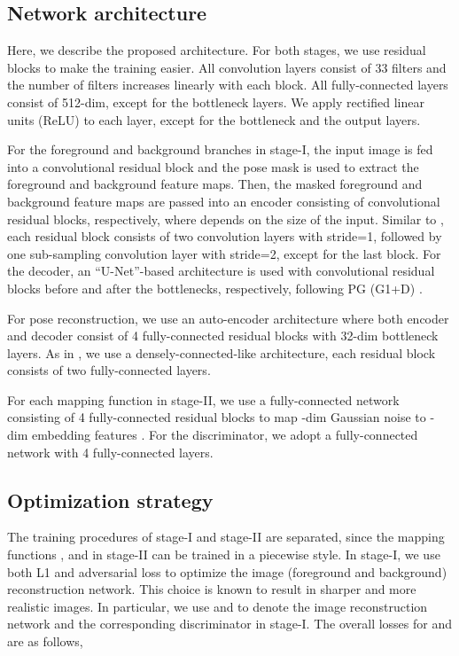 \documentclass[10pt,twocolumn,letterpaper]{article}
\begin{document}
\subsection{Network architecture}
Here, we describe the proposed architecture. 
For both stages, we use residual blocks to make the training easier. 
All convolution layers consist of 33 filters and the number of filters increases linearly with each block. 
All fully-connected layers consist of 512-dim, except for the bottleneck layers. 
We apply rectified linear units (ReLU) to each layer, except for the bottleneck and the output layers.

For the foreground and background branches in stage-\RN{1}, the input image is fed into a convolutional residual block and the pose mask is used to extract the foreground and background feature maps. 
Then, the masked foreground and background feature maps are passed into an encoder consisting of  convolutional residual blocks, respectively, where  depends on the size of the input. 
Similar to \cite{PG2}, each residual block consists of two convolution layers with stride=1, followed by one sub-sampling convolution layer with stride=2, except for the last block. 
For the decoder, an ``U-Net''-based architecture \cite{U-net} is used with  convolutional residual blocks before and after the bottlenecks, respectively, following PG (G1+D) \cite{PG2}.

For pose reconstruction, we use an auto-encoder architecture where both encoder and decoder consist of 4 fully-connected residual blocks with 32-dim bottleneck layers. 
As in \cite{huang2016densely}, we use a densely-connected-like architecture, \ie each residual block consists of two fully-connected layers. 

For each mapping function in stage-\RN{2}, we use a fully-connected network consisting of 4 fully-connected residual blocks to map -dim Gaussian noise  to -dim embedding features . 
For the discriminator, we adopt a fully-connected network with 4 fully-connected layers.

\subsection{Optimization strategy}
The training procedures of stage-\RN{1} and stage-\RN{2} are separated, since the mapping functions ,  and  in stage-\RN{2} can be trained in a piecewise style. 
In stage-\RN{1}, we use both L1 and adversarial loss to optimize the image (\ie foreground and background) reconstruction network. This choice is known to result in sharper and more realistic images. 
In particular, we use  and  to denote the image reconstruction network  and the corresponding discriminator in stage-\RN{1}.
The overall losses for  and  are as follows,
 
\end{document}
